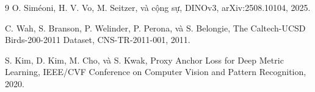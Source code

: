 \documentclass[11pt,a4paper]{article}
\begin{document}
\begin{thebibliography}{9}
O. Siméoni, H. V. Vo, M. Seitzer, và cộng sự,
DINOv3, arXiv:2508.10104, 2025.

C. Wah, S. Branson, P. Welinder, P. Perona, và S. Belongie,
The Caltech-UCSD Birds-200-2011 Dataset, CNS-TR-2011-001, 2011.

S. Kim, D. Kim, M. Cho, và S. Kwak,
Proxy Anchor Loss for Deep Metric Learning,
IEEE/CVF Conference on Computer Vision and Pattern Recognition, 2020.
\end{thebibliography}
\end{document}

